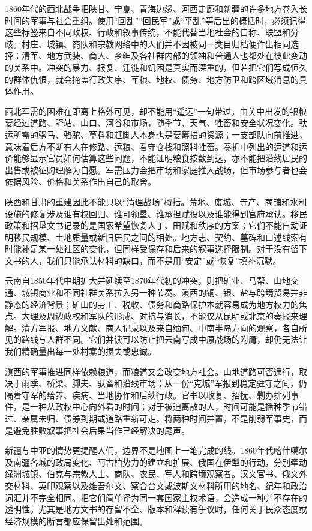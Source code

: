 1860年代的西北战争把陕甘、宁夏、青海边缘、河西走廊和新疆的许多地方卷入长时间的军事与社会重组。使用“回乱”“回民军”或“平乱”等后出的概括时，必须记得这些标签来自不同政权、行政和叙事传统，不能代替当地社会的自称、联盟和分歧。村庄、城镇、商队和宗教网络中的人们并不因被同一类目归档便作出相同选择；清军、地方武装、商人、乡绅及各社群内部的领袖和普通人也都处在彼此变动的关系中。冲突的暴力、报复、迁徙和饥困是真实而深重的，但若把它们写成恒久的群体仇恨，就会掩盖行政失序、军粮、地权、债务、地方防卫和跨区域消息的具体作用。

西北军需的困难在距离上格外可见，却不能用“遥远”一句带过。由关中出发的银粮要经过道路、驿站、山口、河谷和市场，随季节、天气、牲畜和安全状况变化。驮运所需的骡马、骆驼、草料和赶脚人本身也是要筹措的资源；一支部队向前推进，意味着后方不断有人在修路、运粮、看守仓栈和照料牲畜。奏折中列出的运道和运价能够显示官员如何估算这些问题，不能证明粮食按数到达，亦不能把沿线居民的出售或被征购理解为自愿。军需压力会把市场和家庭推入战场，但市场参与者也会依据风险、价格和关系作出自己的取舍。

陕西和甘肃的重建因此不能只以“清理战场”概括。荒地、废城、寺产、商铺和水利设施的修复涉及谁有权回归、谁可领垦、谁承担赋役以及谁能得到官府承认。移民政策和招垦文书记录的是国家希望恢复人丁、田赋和秩序的方案；它们不能自动证明移民规模、土地质量或新旧居民之间的相处。地方志、契约、墓碑和口述线索有时能补足某一处社区的变化，但同样受保存和后来的叙事选择限制。对于没有留下文书的人，我们只能承认材料的缺口，而不是用“安定”或“恢复”填补沉默。

云南自1850年代中期扩大并延续至1870年代初的冲突，则把矿业、马帮、山地交通、城镇商业和不同社群关系拉入另一种节奏。滇西的铜、银、盐与跨境贸易并非静态的经济背景；矿山的劳工、税收、债务和商路保护本就容易成为地方权力的焦点。大理及周边政权和军队的形成、对抗与消长，不能仅从昆明或北京的奏报来理解。清方军报、地方文献、商人记录以及来自缅甸、中南半岛方向的观察，各自所见的路线与人群不同。它们并读可以防止把云南写成中原战场的附庸，却仍无法让我们精确量出每一处村寨的损失或忠诚。

滇西的军事推进同样依赖粮道，而粮道又会改变地方社会。山地道路可否通行，取决于雨季、桥梁、脚夫、驮畜和沿线市场；从一份“克城”军报到稳定驻守之间，仍隔着守军的给养、疾病、当地协作和后续行政。官书以收复、招抚、剿办排列事件，是一种从政权中心向外看的时间；对于被迫离散的人，时间可能是播种季节错过、亲属未归、债券到期或道路重新可走。将两种时间并置，不是削弱军事史，而是避免胜败叙事把社会后果当作已经解决的尾声。

新疆与中亚的情势更提醒人们，边界不是地图上一笔完成的线。1860年代喀什噶尔及南疆各城的政局变化、阿古柏势力的建立和扩展、俄国在伊犁的行动，分别牵动绿洲城镇、伯克与宗教人士、商队、农民、军人和跨境观察者。汉文官书、俄文外交材料、英印观察以及维吾尔文、察合台文或波斯文材料所用的地名、纪年和政治词汇并不完全相同。把它们简单译为同一套国家主权术语，会造成一种并不存在的透明性。尤其是地方文书的存留不全、版本和释读有争议时，任何关于民众态度或经济规模的断言都应保留出处和范围。

